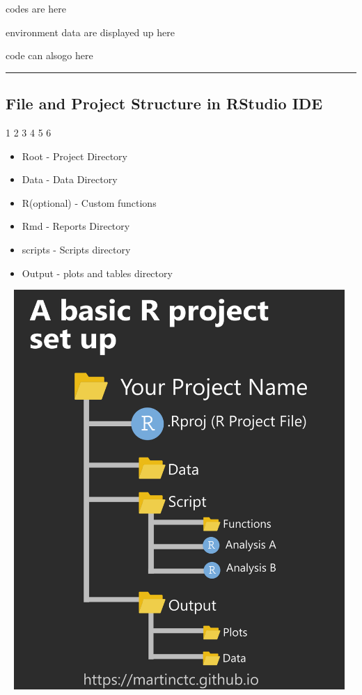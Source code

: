 \documentclass[
  letterpaper,
  DIV=11,
  numbers=noendperiod]{scrartcl}
\providecommand{\tightlist}{%
  \setlength{\itemsep}{0pt}\setlength{\parskip}{0pt}}\usepackage{longtable,booktabs,array}
\begin{document}
codes are here

environment data are displayed up here

code can alsogo here

\begin{center}\rule{0.5\linewidth}{0.5pt}\end{center}

\hypertarget{file-and-project-structure-in-rstudio-ide}{%
\subsection{File and Project Structure in RStudio
IDE}\label{file-and-project-structure-in-rstudio-ide}}

1 {2 3 4 5 6}

\begin{itemize}
\tightlist
\item
  Root - Project Directory
\item
  Data - Data Directory
\item
  R(optional) - Custom functions
\item
  Rmd - Reports Directory
\item
  scripts - Scripts directory
\item
  Output - plots and tables directory
\end{itemize}

\includegraphics[width=5.19792in,height=5.97917in]{images/file-project-structure.png}
\end{document}
